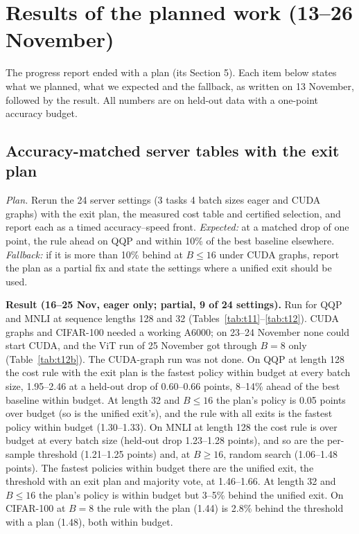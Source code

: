 \section{Results of the planned work (13--26 November)}\label{sec:planned}

The progress report ended with a plan (its Section 5). Each item below states what we planned, what we expected and
the fallback, as written on 13 November, followed by the result. All numbers are on held-out data with a one-point
accuracy budget.

\subsection{Accuracy-matched server tables with the exit plan}\label{sec:server-cert}
\textit{Plan.} Rerun the 24 server settings (3 tasks \x{} 4 batch sizes \x{} eager and CUDA graphs) with the exit
plan, the measured cost table and certified selection, and report each as a timed accuracy--speed front.
\textit{Expected:} at a matched drop of one point, the rule ahead on QQP and within 10\% of the best baseline
elsewhere. \textit{Fallback:} if it is more than 10\% behind at $B\le16$ under CUDA graphs, report the plan as a
partial fix and state the settings where a unified exit should be used.

\textbf{Result (16--25 Nov, eager only; partial, 9 of 24 settings).} Run for QQP and MNLI at sequence lengths 128 and
32 (Tables~\ref{tab:t11}--\ref{tab:t12}). CUDA graphs and CIFAR-100 needed a working A6000; on 23--24 November none
could start CUDA, and the ViT run of 25 November got through $B=8$ only (Table~\ref{tab:t12b}). The CUDA-graph run
was not done. On QQP at length 128 the cost rule with the exit plan is the fastest policy within budget at every
batch size, 1.95--2.46\x{} at a held-out drop of 0.60--0.66 points, 8--14\% ahead of the best baseline within budget.
At length 32 and $B\le16$ the plan's policy is 0.05 points over budget (so is the unified exit's), and the rule with
all exits is the fastest policy within budget (1.30--1.33\x). On MNLI at length 128 the cost rule is over budget at
every batch size (held-out drop 1.23--1.28 points), and so are the per-sample threshold (1.21--1.25 points) and, at
$B\ge16$, random search (1.06--1.48 points). The fastest policies within budget there are the unified exit, the threshold with an exit
plan and majority vote, at 1.46--1.66\x. At length 32 and $B\le16$ the plan's policy is within budget but 3--5\%
behind the unified exit. On CIFAR-100 at $B=8$ the rule with the plan (1.44\x) is 2.8\% behind the threshold with a
plan (1.48\x), both within budget.

